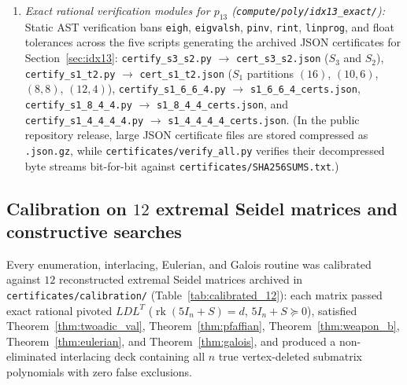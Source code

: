 \documentclass[11pt,reqno]{amsart}
\theoremstyle{definition}
\theoremstyle{remark}
\numberwithin{equation}{section}
\numberwithin{table}{section}
\DeclareMathOperator{\rk}{rk}
\begin{document}
\begin{enumerate}
  \item \emph{Exact rational verification modules for $p_{13}$ (\nolinkurl{compute/poly/idx13_exact/}):} Static AST verification bans \texttt{eigh}, \texttt{eigvalsh}, \texttt{pinv}, \texttt{rint}, \texttt{linprog}, and float tolerances across the five scripts generating the archived JSON certificates for Section~\ref{sec:idx13}: \nolinkurl{certify_s3_s2.py} $\to$ \nolinkurl{cert_s3_s2.json} ($S_3$ and $S_2$), \nolinkurl{certify_s1_t2.py} $\to$ \nolinkurl{cert_s1_t2.json} ($S_1$ partitions $(16)$, $(10,6)$, $(8,8)$, $(12,4)$), \nolinkurl{certify_s1_6_6_4.py} $\to$ \nolinkurl{s1_6_6_4_certs.json}, \nolinkurl{certify_s1_8_4_4.py} $\to$ \nolinkurl{s1_8_4_4_certs.json}, and \nolinkurl{certify_s1_4_4_4_4.py} $\to$ \nolinkurl{s1_4_4_4_4_certs.json}. (In the public repository release, large JSON certificate files are stored compressed as \texttt{.json.gz}, while \nolinkurl{certificates/verify_all.py} verifies their decompressed byte streams bit-for-bit against \nolinkurl{certificates/SHA256SUMS.txt}.)
\end{enumerate}

\subsection{Calibration on \texorpdfstring{$12$}{12} extremal Seidel matrices and constructive searches}
Every enumeration, interlacing, Eulerian, and Galois routine was calibrated against $12$ reconstructed extremal Seidel matrices archived in \nolinkurl{certificates/calibration/} (Table~\ref{tab:calibrated_12}): each matrix passed exact rational pivoted $LDL^T$ ($\rk(5I_n + S) = d$, $5I_n + S \succeq 0$), satisfied Theorem~\ref{thm:twoadic_val}, Theorem~\ref{thm:pfaffian}, Theorem~\ref{thm:weapon_b}, Theorem~\ref{thm:eulerian}, and Theorem~\ref{thm:galois}, and produced a non-eliminated interlacing deck containing all $n$ true vertex-deleted submatrix polynomials with zero false exclusions.
\end{document}
